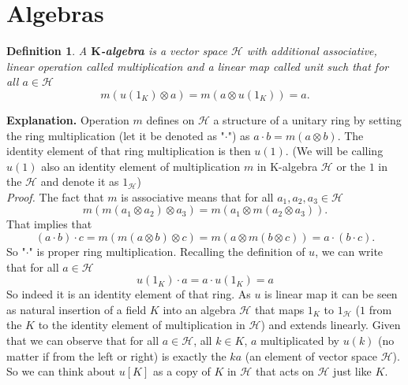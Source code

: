 \documentclass[a4paper, 12pt]{report}
\newtheorem{definition}{Definition}
\begin{document}
\section{Algebras}
\begin{definition}
A \textbf{$\textbf{K}$-algebra} is a vector space $\mathcal{H}$ with additional
associative, linear operation
 called multiplication and a linear map
 called unit such that for all $a \in \mathcal{H}$
\begin{equation*}
m(u(1_K) \otimes a) = m(a \otimes u(1_K)) = a.
\end{equation*}
\end{definition}
\textbf{Explanation. } Operation $m$ defines on $\mathcal{H}$ a structure of a unitary ring by setting the
ring multiplication (let it be denoted as "$\cdot$") as $a \cdot b = m(a \otimes b)$. The identity element
of that ring multiplication is then $u(1)$. (We will be calling $u(1)$ also an identity element of
multiplication $m$ in K-algebra $\mathcal{H}$ or the $1$ in the $\mathcal{H}$ and
denote it as $1_\mathcal{H}$)\\
\textit{Proof.} The fact that $m$ is associative means that for all $a_1, a_2, a_3 \in \mathcal{H}$
\begin{equation*}
m(m(a_1 \otimes a_2) \otimes a_3) = m(a_1 \otimes m(a_2 \otimes a_3)).
\end{equation*}
That implies that
\begin{equation*}
(a\cdot b) \cdot c = m(m(a \otimes b) \otimes c) = m(a \otimes m(b \otimes c)) = a \cdot (b \cdot c).
\end{equation*}
So "$\cdot$" is proper ring multiplication. Recalling the definition of $u$, we can write that for all
$a \in \mathcal{H}$
\begin{equation*}
u(1_K) \cdot a = a \cdot u(1_K) = a
\end{equation*}
So indeed it is an identity
element of that ring. As $u$ is linear map it can be seen as natural insertion of a field $K$ into an
algebra $\mathcal{H}$ that maps $1_K$ to $1_\mathcal{H}$ ($1$ from the $K$ to the identity element of
multiplication in $\mathcal{H}$) and extends linearly. Given that we can observe
that for all $a \in \mathcal{H}$, all $k \in K$, $a$ multiplicated by $u(k)$ (no matter if from the left
or right) is exactly the $ka$ (an element of vector space $\mathcal{H}$).
So we can think about $u[K]$ as a copy of $K$ in $\mathcal{H}$ that acts on $\mathcal{H}$ just like $K$.\\
\end{document}
